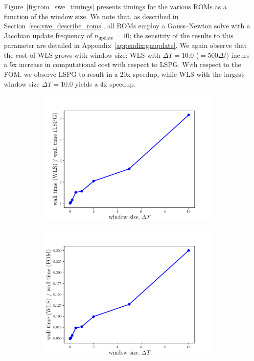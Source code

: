 Figure~\ref{fig:rom_swe_timings} presents timings for the various ROMs as a function of the window size. We note that, as described in Section~\ref{sec:swe_describe_roms}, all ROMs employ a Gauss--Newton solve with a Jacobian update frequency of $n_{\text{update}} = 10$; the sensitity of the results to this parameter are detailed in Appendix~\ref{appendix:gnupdate}. We again observe that the cost of WLS grows with window size: WLS with $\Delta T = 10.0$ ($=500\Delta t$) incurs a 5x increase in computational cost with respect to LSPG. With respect to the FOM, we observe LSPG to result in a $20$x speedup, while WLS with the largest window size $\Delta T = 10.0$ yields a $4$x speedup.  
\begin{figure}
\begin{center}
\begin{subfigure}[t]{0.49\textwidth}
\includegraphics[trim={0cm 0cm 0cm 0cm},clip,width=1.0\linewidth]{figs/swe/swe_windowSize_vs_walltimeLspg_updateFreq_K83.pdf}
\end{subfigure}
\begin{subfigure}[t]{0.49\textwidth}
\includegraphics[trim={0cm 0cm 0cm 0cm},clip,width=1.0\linewidth]{figs/swe/swe_windowSize_vs_walltimeFom_updateFreq_K83.pdf}

\end{subfigure}
\end{center}
\end{figure}
